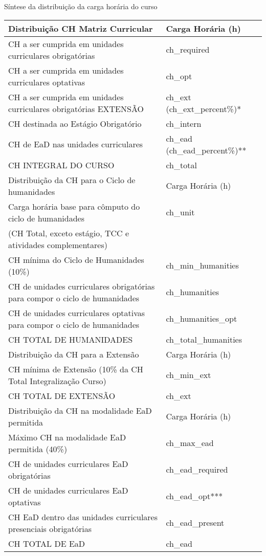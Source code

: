 \begin{quadro}[ht!]
\centering
\caption{Síntese da distribuição da carga horária do curso}

\small
\begin{tabular}{| l | l |}
\hline
\rowcolor{blue1}
Distribuição CH Matriz Curricular & Carga Horária (h)  \\
\hline
CH a ser  cumprida em unidades curriculares obrigatórias & {{ch_required}}\\ \hline
CH a ser  cumprida em unidades curriculares optativas & {{ch_opt}}\\ \hline
CH a ser cumprida em unidades curriculares obrigatórias EXTENSÃO & {{ch_ext}} ({{ch_ext_percent}}\%)* \\\hline
CH destinada ao Estágio Obrigatório & {{ch_intern}} \\ \hline
CH de EaD nas unidades curriculares & {{ch_ead}} ({{ch_ead_percent}}\%)** \\ \hline
CH  INTEGRAL DO CURSO & {{ch_total}}\\ \hline
\rowcolor{blue1}
Distribuição da CH para o Ciclo de humanidades & Carga Horária (h)  \\
\hline
Carga horária base para cômputo do ciclo de humanidades & {{ch_unit}}\\
(CH Total, exceto estágio, TCC e atividades complementares) & \\ \hline
CH mínima do Ciclo de Humanidades (10\%) & {{ch_min_humanities}} \\ \hline
CH de unidades curriculares obrigatórias para compor o ciclo de humanidades & {{ch_humanities}} \\ \hline
CH de unidades curriculares optativas para compor o ciclo de humanidades & {{ch_humanities_opt}} \\ \hline
CH TOTAL DE HUMANIDADES & {{ch_total_humanities}}\\ \hline
\rowcolor{blue1}
Distribuição da CH para a Extensão & Carga Horária (h)  \\
\hline
CH mínima de Extensão (10\% da CH Total Integralização Curso) & {{ch_min_ext}}\\ \hline
CH TOTAL DE EXTENSÃO & {{ch_ext}} \\ \hline
\rowcolor{blue1}
Distribuição da CH na modalidade EaD permitida & Carga Horária (h)  \\
\hline
Máximo CH na modalidade EaD permitida (40\%) & {{ch_max_ead}}\\ \hline
CH de unidades curriculares EaD obrigatórias & {{ch_ead_required}} \\ \hline
CH de unidades curriculares EaD optativas & {{ch_ead_opt}}***\\ \hline
CH EaD dentro das unidades curriculares presenciais obrigatórias & {{ch_ead_present}}\\ \hline
CH TOTAL DE EaD & {{ch_ead}}\\ \hline


\end{tabular}
\end{quadro}
